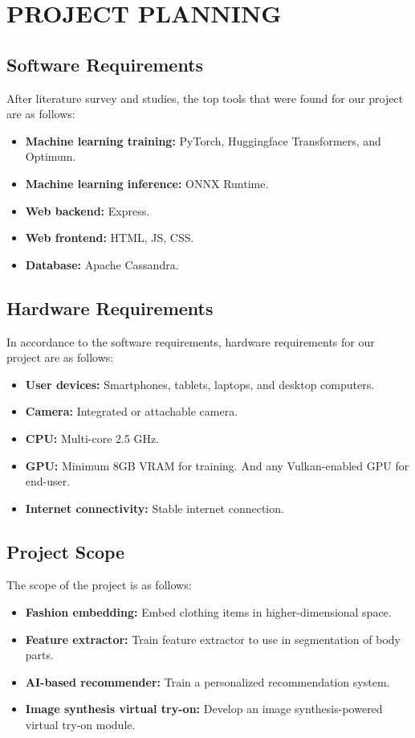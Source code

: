 \chapter[Project Planning]{PROJECT PLANNING}

\section{Software Requirements}
	After literature survey and studies, the top tools that were found for our project are as follows:

	\begin{itemize}
		\item \textbf{Machine learning training:} PyTorch, Huggingface Transformers, and Optimum.
		\item \textbf{Machine learning inference:} ONNX Runtime.
		\item \textbf{Web backend:} Express.
		\item \textbf{Web frontend:} HTML, JS, CSS.
		\item \textbf{Database:} Apache Cassandra.
	\end{itemize}

\section{Hardware Requirements}
	In accordance to the software requirements, hardware requirements for our project are as follows:

	\begin{itemize}
		\item \textbf{User devices:} Smartphones, tablets, laptops, and desktop computers.
		\item \textbf{Camera:} Integrated or attachable camera.
		\item \textbf{CPU:} Multi-core 2.5 GHz.
		\item \textbf{GPU:} Minimum 8GB VRAM for training. And any Vulkan-enabled GPU for end-user.
		\item \textbf{Internet connectivity:} Stable internet connection.
	\end{itemize}

\section{Project Scope}
	The scope of the project is as follows:
	
	\begin{itemize}
		\item \textbf{Fashion embedding:} Embed clothing items in higher-dimensional space.
		\item \textbf{Feature extractor:} Train feature extractor to use in segmentation of body parts.
		\item \textbf{AI-based recommender:} Train a personalized recommendation system.
		\item \textbf{Image synthesis virtual try-on:} Develop an image synthesis-powered virtual try-on module.
	\end{itemize}

